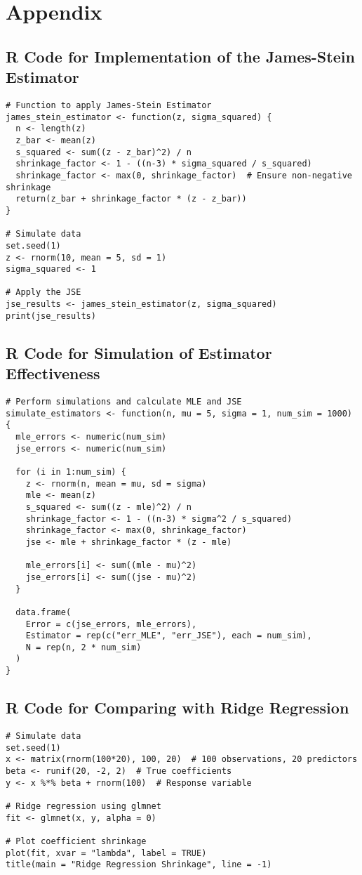 \section{Appendix}

\subsection{R Code for Implementation of the James-Stein Estimator}

\begin{verbatim}
# Function to apply James-Stein Estimator
james_stein_estimator <- function(z, sigma_squared) {
  n <- length(z)
  z_bar <- mean(z)
  s_squared <- sum((z - z_bar)^2) / n
  shrinkage_factor <- 1 - ((n-3) * sigma_squared / s_squared)
  shrinkage_factor <- max(0, shrinkage_factor)  # Ensure non-negative shrinkage
  return(z_bar + shrinkage_factor * (z - z_bar))
}

# Simulate data
set.seed(1)
z <- rnorm(10, mean = 5, sd = 1)
sigma_squared <- 1

# Apply the JSE
jse_results <- james_stein_estimator(z, sigma_squared)
print(jse_results)
\end{verbatim}

\subsection{R Code for Simulation of Estimator Effectiveness}

\begin{verbatim}
# Perform simulations and calculate MLE and JSE
simulate_estimators <- function(n, mu = 5, sigma = 1, num_sim = 1000) {
  mle_errors <- numeric(num_sim)
  jse_errors <- numeric(num_sim)
  
  for (i in 1:num_sim) {
    z <- rnorm(n, mean = mu, sd = sigma)
    mle <- mean(z)
    s_squared <- sum((z - mle)^2) / n
    shrinkage_factor <- 1 - ((n-3) * sigma^2 / s_squared)
    shrinkage_factor <- max(0, shrinkage_factor)
    jse <- mle + shrinkage_factor * (z - mle)
    
    mle_errors[i] <- sum((mle - mu)^2)
    jse_errors[i] <- sum((jse - mu)^2)
  }
  
  data.frame(
    Error = c(jse_errors, mle_errors),
    Estimator = rep(c("err_MLE", "err_JSE"), each = num_sim),
    N = rep(n, 2 * num_sim)
  )
}
\end{verbatim}

\subsection{R Code for Comparing with Ridge Regression}

\begin{verbatim}
# Simulate data
set.seed(1)
x <- matrix(rnorm(100*20), 100, 20)  # 100 observations, 20 predictors
beta <- runif(20, -2, 2)  # True coefficients
y <- x %*% beta + rnorm(100)  # Response variable

# Ridge regression using glmnet
fit <- glmnet(x, y, alpha = 0)

# Plot coefficient shrinkage
plot(fit, xvar = "lambda", label = TRUE)
title(main = "Ridge Regression Shrinkage", line = -1)
\end{verbatim}